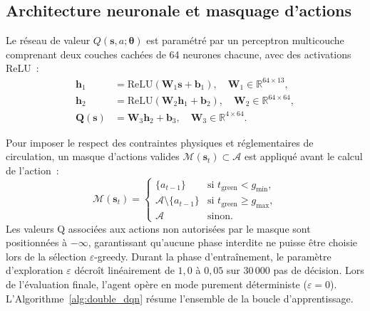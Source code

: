 \documentclass[10pt,twocolumn,letterpaper]{article}
\begin{document}
\subsection{Architecture neuronale et masquage d'actions}
Le réseau de valeur $Q(\mathbf{s}, a; \boldsymbol{\theta})$ est paramétré par un perceptron multicouche comprenant deux couches cachées de 64 neurones chacune, avec des activations ReLU~:
\begin{align}
\mathbf{h}_1 &= \text{ReLU}(\mathbf{W}_1 \mathbf{s} + \mathbf{b}_1), \quad \mathbf{W}_1 \in \mathbb{R}^{64 \times 13}, \\
\mathbf{h}_2 &= \text{ReLU}(\mathbf{W}_2 \mathbf{h}_1 + \mathbf{b}_2), \quad \mathbf{W}_2 \in \mathbb{R}^{64 \times 64}, \\
\mathbf{Q}(\mathbf{s}) &= \mathbf{W}_3 \mathbf{h}_2 + \mathbf{b}_3, \quad \mathbf{W}_3 \in \mathbb{R}^{4 \times 64}.
\end{align}

Pour imposer le respect des contraintes physiques et réglementaires de circulation, un masque d'actions valides $\mathcal{M}(\mathbf{s}_t) \subset \mathcal{A}$ est appliqué avant le calcul de l'action~:
\begin{equation}
\mathcal{M}(\mathbf{s}_t) = \begin{cases}
\{a_{t-1}\} & \text{si } t_{\text{green}} < g_{\min}, \\
\mathcal{A} \setminus \{a_{t-1}\} & \text{si } t_{\text{green}} \ge g_{\max}, \\
\mathcal{A} & \text{sinon.}
\end{cases}
\end{equation}
Les valeurs Q associées aux actions non autorisées par le masque sont positionnées à $-\infty$, garantissant qu'aucune phase interdite ne puisse être choisie lors de la sélection $\varepsilon$-greedy. Durant la phase d'entraînement, le paramètre d'exploration $\varepsilon$ décroît linéairement de $1{,}0$ à $0{,}05$ sur $30\,000$ pas de décision. Lors de l'évaluation finale, l'agent opère en mode purement déterministe ($\varepsilon = 0$). L'Algorithme~\ref{alg:double_dqn} résume l'ensemble de la boucle d'apprentissage.
\end{document}
